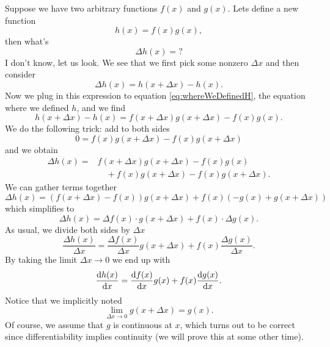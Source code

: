 Suppose we have two arbitrary functions $f(x)$ and $g(x)$. Lets
define a new function
\begin{equation}\label{eq:whereWeDefinedH}
h(x)=f(x)g(x),
\end{equation}
then what's
\begin{equation}
\Delta h(x)=?
\end{equation}
I don't know, let us look. We see that we first pick some nonzero
$\Delta x$ and then consider
\begin{equation}
\Delta h(x)=h(x+\Delta x)-h(x).
\end{equation}
Now we plug in this expression to equation
\eqref{eq:whereWeDefinedH}, the equation where we defined $h$,
and we find
\begin{equation}
h(x+\Delta x)-h(x)=f(x+\Delta x)g(x+\Delta x)-f(x)g(x).
\end{equation}
We do the following trick: add to both sides
\begin{equation}
0=f(x)g(x+\Delta x)-f(x)g(x+\Delta x)
\end{equation}
and we obtain
\begin{equation}
\begin{split}
\Delta h(x)=&f(x+\Delta x)g(x+\Delta x)-f(x)g(x) \\
&\quad+f(x)g(x+\Delta x)-f(x)g(x+\Delta x).
\end{split}
\end{equation}
We can gather terms together
\begin{equation}
\Delta h(x)=(f(x+\Delta x)-f(x))g(x+\Delta
x)+f(x)(-g(x)+g(x+\Delta x))
\end{equation}
which simplifies to
\begin{equation}
\Delta h(x)=\Delta f(x)\cdot g(x+\Delta x)+f(x)\cdot\Delta g(x).
\end{equation}
As usual, we divide both sides by $\Delta x$
\begin{equation}
\frac{\Delta h(x)}{\Delta x}=\frac{\Delta f(x)}{\Delta x}g(x+\Delta x)
+f(x)\frac{\Delta g(x)}{\Delta x}.
\end{equation}
By taking the limit $\Delta x\to 0$ we end up with
\begin{equation}
\frac{\mathrm{d} h(x)}{\mathrm{d} x}=\frac{\mathrm{d} f(x)}{\mathrm{d} x}g(x)+f(x)\frac{\mathrm{d} g(x)}{\mathrm{d} x}.
\end{equation}
Notice that we implicitly noted
\begin{equation}
\lim_{\Delta x\to 0}g(x+\Delta x)=g(x).
\end{equation}
Of course, we assume that $g$ is continuous at $x$, which turns
out to be correct since differentiability implies continuity (we
will prove this at some other time).

